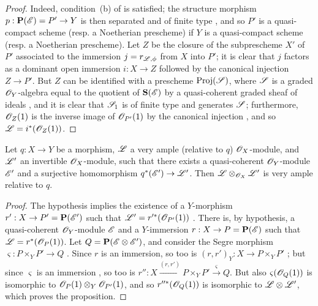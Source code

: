 \begin{proof}
Indeed, condition~(b) of  is satisfied;
the structure morphism $p:\bb{P}(\sh{E})=P'\to Y$ is then separated and of finite type , and so $P'$ is a quasi-compact scheme (resp. a Noetherian prescheme) if $Y$ is a quasi-compact scheme (resp. a Noetherian prescheme).
Let $Z$ be the closure  of the subprescheme $X'$ of $P'$ associated to the immersion $j=r_{\mathscr{L},\phi}$ from $X$ into $P'$;
it is clear that $j$ factors as a dominant open immersion $i:X\to Z$ followed by the canonical injection $Z\to P'$.
But $Z$ can be identified with a prescheme $\operatorname{Proj}(\mathscr{S})$, where $\mathscr{S}$ is a graded $\mathscr{O}_Y$-algebra equal to the quotient of $\mathbf{S}(\mathscr{E})$ by a quasi-coherent graded sheaf of ideals , and it is clear that $\mathscr{S}_1$ is of finite type and generates $\mathscr{S}$;
furthermore, $\mathscr{O}_Z(1)$ is the inverse image of $\mathscr{O}_{P'}(1)$ by the canonical injection , and so $\mathscr{L}=i^*(\mathscr{O}_Z(1))$.
\end{proof}

\begin{proposition}[4.4.8]
\label{II.4.4.8}
Let $q:X\to Y$ be a morphism, $\mathscr{L}$ a very ample (relative to $q$) $\mathscr{O}_X$-module, and $\mathscr{L}'$ an invertible $\mathscr{O}_X$-module, such that there exists a quasi-coherent $\mathscr{O}_Y$-module $\mathscr{E}'$ and a surjective homomorphism $q^*(\sh{E}')\to\sh{L}'$.
Then $\mathscr{L}\otimes_{\mathscr{O}_X}\mathscr{L}'$ is very ample relative to $q$.
\end{proposition}

\begin{proof}
The hypothesis implies the existence of a $Y$-morphism $r':X\to P'=\bb{P}(\sh{E}')$ such that $\mathscr{L}'=r'^*(\mathscr{O}_{P'}(1))$ .
There is, by hypothesis, a quasi-coherent $\mathscr{O}_Y$-module $\mathscr{E}$ and a
$Y$-immersion $r:X\to P=\bb{P}(\sh{E})$ such that $\mathscr{L}=r^*(\mathscr{O}_P(1))$.
Let $Q=\mathbf{P}(\mathscr{E}\otimes\mathscr{E}')$, and consider the Segre morphism $\varsigma:P\times_Y P'\to Q$ .
Since $r$ is an immersion, so too is $(r,r')_Y:X\to P\times_Y P'$ ;
but since $\varsigma$ is an immersion , so too is $r'':X\xrightarrow{(r,r')}P\times_Y P'\xrightarrow{\varsigma}Q$.
But also  $\varsigma(\mathscr{O}_Q(1))$ is isomorphic to $\mathscr{O}_P(1)\otimes_Y\mathscr{O}_{P'}(1)$, and so  $r''^*(\mathscr{O}_Q(1))$ is isomorphic to $\mathscr{L}\otimes\mathscr{L}'$, which proves the proposition.
\end{proof}

